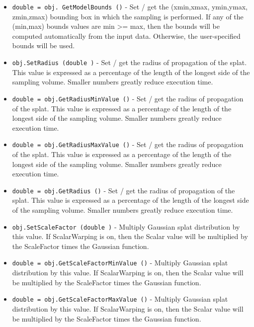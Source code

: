 \begin{itemize}
\item  \verb|double = obj. GetModelBounds ()| -  Set / get the (xmin,xmax, ymin,ymax, zmin,zmax) bounding box in which
 the sampling is performed. If any of the (min,max) bounds values are
 min >= max, then the bounds will be computed automatically from the input
 data. Otherwise, the user-specified bounds will be used.

\item  \verb|obj.SetRadius (double )| -  Set / get the radius of propagation of the splat. This value is expressed
 as a percentage of the length of the longest side of the sampling
 volume. Smaller numbers greatly reduce execution time.

\item  \verb|double = obj.GetRadiusMinValue ()| -  Set / get the radius of propagation of the splat. This value is expressed
 as a percentage of the length of the longest side of the sampling
 volume. Smaller numbers greatly reduce execution time.

\item  \verb|double = obj.GetRadiusMaxValue ()| -  Set / get the radius of propagation of the splat. This value is expressed
 as a percentage of the length of the longest side of the sampling
 volume. Smaller numbers greatly reduce execution time.

\item  \verb|double = obj.GetRadius ()| -  Set / get the radius of propagation of the splat. This value is expressed
 as a percentage of the length of the longest side of the sampling
 volume. Smaller numbers greatly reduce execution time.

\item  \verb|obj.SetScaleFactor (double )| -  Multiply Gaussian splat distribution by this value. If ScalarWarping
 is on, then the Scalar value will be multiplied by the ScaleFactor
 times the Gaussian function.

\item  \verb|double = obj.GetScaleFactorMinValue ()| -  Multiply Gaussian splat distribution by this value. If ScalarWarping
 is on, then the Scalar value will be multiplied by the ScaleFactor
 times the Gaussian function.

\item  \verb|double = obj.GetScaleFactorMaxValue ()| -  Multiply Gaussian splat distribution by this value. If ScalarWarping
 is on, then the Scalar value will be multiplied by the ScaleFactor
 times the Gaussian function.


\end{itemize}

